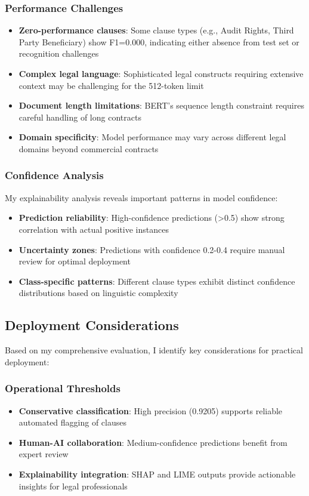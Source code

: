 \subsubsection{Performance Challenges}
\begin{itemize}
\item \textbf{Zero-performance clauses}: Some clause types (e.g., Audit Rights, Third Party Beneficiary) show F1=0.000, indicating either absence from test set or recognition challenges
\item \textbf{Complex legal language}: Sophisticated legal constructs requiring extensive context may be challenging for the 512-token limit
\item \textbf{Document length limitations}: BERT's sequence length constraint requires careful handling of long contracts
\item \textbf{Domain specificity}: Model performance may vary across different legal domains beyond commercial contracts
\end{itemize}

\subsubsection{Confidence Analysis}
My explainability analysis reveals important patterns in model confidence:

\begin{itemize}
\item \textbf{Prediction reliability}: High-confidence predictions (>0.5) show strong correlation with actual positive instances
\item \textbf{Uncertainty zones}: Predictions with confidence 0.2-0.4 require manual review for optimal deployment
\item \textbf{Class-specific patterns}: Different clause types exhibit distinct confidence distributions based on linguistic complexity
\end{itemize}

\subsection{Deployment Considerations}
\label{subsec:deployment}

Based on my comprehensive evaluation, I identify key considerations for practical deployment:

\subsubsection{Operational Thresholds}
\begin{itemize}
\item \textbf{Conservative classification}: High precision (0.9205) supports reliable automated flagging of clauses
\item \textbf{Human-AI collaboration}: Medium-confidence predictions benefit from expert review
\item \textbf{Explainability integration}: SHAP and LIME outputs provide actionable insights for legal professionals
\end{itemize}

